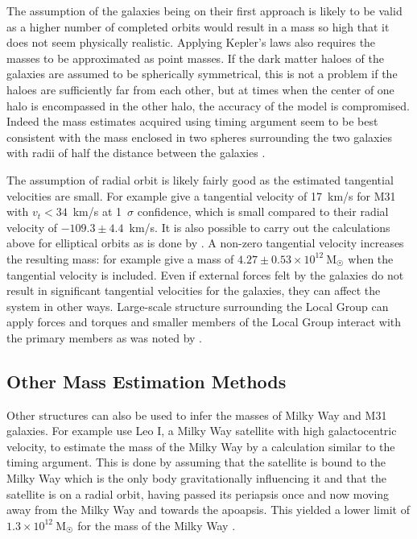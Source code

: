 \documentclass[english, twoside]{HYgradu}
\begin{document}
The assumption of the galaxies being on their first approach is likely to be valid as a higher number of completed orbits would result in a mass so high that it does not seem physically realistic. Applying Kepler's laws also requires the masses to be approximated as point masses.  If the dark matter haloes of the galaxies are assumed to be spherically symmetrical, this is not a problem if the haloes are sufficiently far from each other, but at times when the center of one halo is encompassed in the other halo, the accuracy of the model is compromised. Indeed the mass estimates acquired using timing argument seem to be best consistent with the mass enclosed in two spheres surrounding the two galaxies with radii of half the distance between the galaxies \citep{kroeker1991accuracy}. 

The assumption of radial orbit is likely fairly good as the estimated tangential velocities are small. For example \citet{vandermarel2012m31} give a tangential velocity of 17~km/s for M31 with $v_{t} < 34$~km/s at 1~$\sigma$ confidence, which is small compared to their radial velocity of $-109.3 \pm 4.4$~km/s. It is also possible to carry out the calculations above for elliptical orbits as is done by \citet{einasto1982mass}. A non-zero tangential velocity increases the resulting mass: for example \citet{vandermarel2012m31} give a mass of $4.27 \pm 0.53 \times 10^{12}~\mathrm{M_{\astrosun}}$ when the tangential velocity is included. Even if external forces felt by the galaxies do not result in significant tangential velocities for the galaxies, they can affect the system in other ways. Large-scale structure surrounding the Local Group can apply forces and torques and smaller members of the Local Group interact with the primary members as was noted by \citet{kahn1959intergalactic}.


\subsection{Other Mass Estimation Methods} \label{sect:other_mass_estimation}

Other structures can also be used to infer the masses of Milky Way and M31 galaxies. For example \citet{zaritsky1989velocities} use Leo I, a Milky Way satellite with high galactocentric velocity, to estimate the mass of the Milky Way by a calculation similar to the timing argument. This is done by assuming that the satellite is bound to the Milky Way which is the only body gravitationally influencing it and that the satellite is on a radial orbit, having passed its periapsis once and now moving away from the Milky Way and towards the apoapsis. This yielded a lower limit of $1.3 \times 10^{12}~\mathrm{M_{\astrosun}}$ for the mass of the Milky Way \citep{zaritsky1989velocities}.
\end{document}
